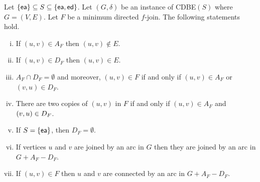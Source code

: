 \documentclass[11pt]{llncs}
\newcommand{\ed}{{\sf ed}}
\newcommand{\ea}{{\sf ea}}
\newcommand{\cdbe}{{\sc CDBE}}
\begin{document}
\begin{lemma}\label{l-weakly}
\begin{sloppypar}
Let $\{\ea\}\subseteq S \subseteq \{\ea,\ed\}$.  Let $(G,\delta)$ be an
instance of \cdbe$(S)$ where $G=(V,E)$.  Let $F$ be a minimum directed
$f$-join. The following statements hold.
\end{sloppypar}
\begin{enumerate}[(i)]
\renewcommand{\theenumi}{(\roman{enumi})}
\renewcommand\labelenumi{\theenumi}
\item \label{stat:uv-A-uv-not-E} If $(u,v)\in A_F$ then $(u,v)\notin E$.
\item \label{stat:uv-D-uv-E} If $(u,v)\in D_F$ then $(u,v)\in E$.
\item \label{stat:A-D-disjoint} $A_F\cap D_F=\emptyset$ and moreover, $(u,v)\in F$ if and only if $(u,v)\in A_F$ or $(v,u)\in D_F$. 
\item \label{stat:two-copies-F} There are two copies of $(u,v)$ in $F$ if and only if $(u,v)\in
A_F$ and $(v,u)\in\nobreak  D_F$.
\item \label{stat:no-ed-D-empty} If $S=\{\ea\}$, then $D_F=\emptyset$.
\item \label{stat:never-disconnect} If vertices $u$ and $v$ are joined by an arc in $G$ then they are
joined by an arc in $G+A_F-D_F$.
\item \label{stat:never-disconnect-changed} If $(u,v) \in F$ then $u$ and $v$ are connected by an arc in $G+A_F-D_F$.
\end{enumerate}
\end{lemma}
\end{document}
